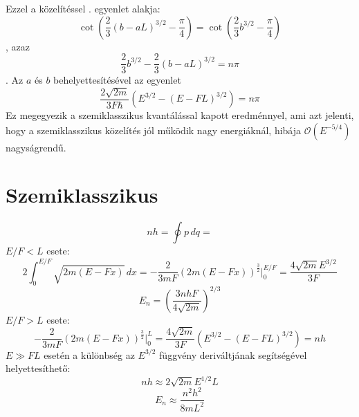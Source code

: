 \documentclass[a4paper,titlepage]{article}
\begin{document}
	Ezzel a közelítéssel . egyenlet alakja:
	\begin{equation}
		\cot\left(\frac{2}{3}\left(b-aL\right)^{3/2} - \frac{\pi}{4}\right) = \cot\left(\frac{2}{3}b^{3/2} - \frac{\pi}{4}\right)
	\end{equation}
	, azaz
	\begin{equation}
		\frac{2}{3}b^{3/2} - \frac{2}{3}\left(b-aL\right)^{3/2} = n\pi
	\end{equation}
	. Az $a$ és $b$ behelyettesítésével az egyenlet
	\begin{equation}
		\frac{2\sqrt{2m}}{3F\hbar}\left(E^{3/2} - \left(E - FL\right)^{3/2}\right) = n\pi
	\end{equation}
	Ez megegyezik a szemiklasszikus kvantálással kapott eredménnyel, ami azt jelenti, hogy a szemiklasszikus közelítés jól működik nagy energiáknál, hibája $\mathcal{O}\left(E^{-5/4}\right)$ nagyságrendű.

\section{Szemiklasszikus}
	\begin{equation}
		nh = \oint p \, dq = 
	\end{equation}
	$E/F < L$ esete:
	\begin{equation}
		2\int_0^{E/F}\sqrt{2m\left( E-Fx \right)}\,dx = -\frac{2}{3mF}\left(2m\left( E-Fx \right)\right)^{\frac{3}{2}}\bigg \rvert_0^{E/F} = \frac{4\sqrt{2m}E^{3/2}}{3F}
	\end{equation}
	\begin{equation}
		E_n = \left(\frac{3nhF}{4\sqrt{2m}}\right)^{2/3}
	\end{equation}
	$E/F > L$ esete:
	\begin{equation}
		-\frac{2}{3mF}\left(2m\left( E-Fx \right)\right)^{\frac{3}{2}}\bigg \rvert_0^{L} = \frac{4\sqrt{2m}}{3F}\left(E^{3/2} - \left(E - FL\right)^{3/2}\right) = nh
	\end{equation}
	$E \gg FL$ esetén a különbség az $E^{3/2}$ függvény deriváltjának segítségével helyettesíthető:
	\begin{equation}
		nh \approx 2\sqrt{2m}E^{1/2}L
	\end{equation}
	\begin{equation}
		E_n \approx \frac{n^2h^2}{8mL^2}
	\end{equation}
	
\end{document}
